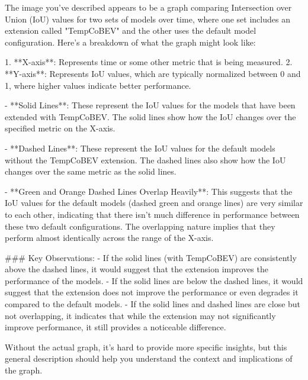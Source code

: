 The image you've described appears to be a graph comparing Intersection over Union (IoU) values for two sets of models over time, where one set includes an extension called "TempCoBEV" and the other uses the default model configuration. Here's a breakdown of what the graph might look like:

1. **X-axis**: Represents time or some other metric that is being measured.
2. **Y-axis**: Represents IoU values, which are typically normalized between 0 and 1, where higher values indicate better performance.

- **Solid Lines**: These represent the IoU values for the models that have been extended with TempCoBEV. The solid lines show how the IoU changes over the specified metric on the X-axis.
  
- **Dashed Lines**: These represent the IoU values for the default models without the TempCoBEV extension. The dashed lines also show how the IoU changes over the same metric as the solid lines.

- **Green and Orange Dashed Lines Overlap Heavily**: This suggests that the IoU values for the default models (dashed green and orange lines) are very similar to each other, indicating that there isn't much difference in performance between these two default configurations. The overlapping nature implies that they perform almost identically across the range of the X-axis.

### Key Observations:
- If the solid lines (with TempCoBEV) are consistently above the dashed lines, it would suggest that the extension improves the performance of the models.
- If the solid lines are below the dashed lines, it would suggest that the extension does not improve the performance or even degrades it compared to the default models.
- If the solid lines and dashed lines are close but not overlapping, it indicates that while the extension may not significantly improve performance, it still provides a noticeable difference.

Without the actual graph, it's hard to provide more specific insights, but this general description should help you understand the context and implications of the graph.